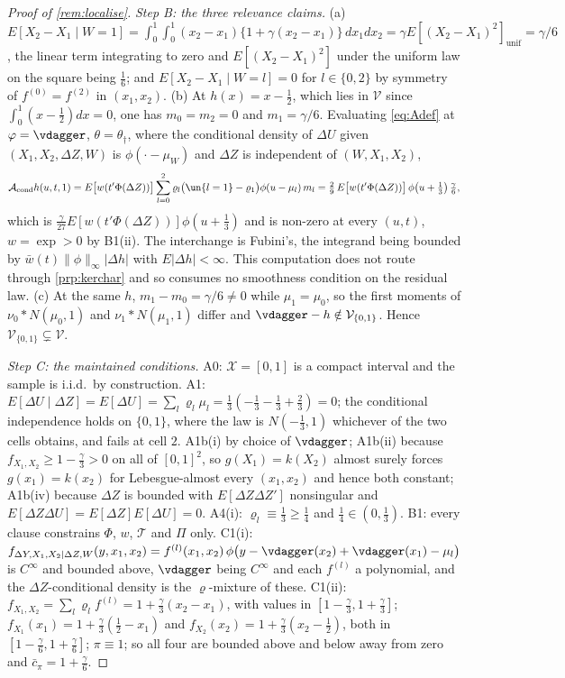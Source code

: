 \begin{proof}[Proof of \cref{rem:localise}]
\emph{Step B: the three relevance claims.} (a) $E[X_2-X_1\mid W=1]
=\int_0^1\!\!\int_0^1(x_2-x_1)\{1+\gamma(x_2-x_1)\}\,dx_1dx_2=\gamma E[(X_2-X_1)^{2}]_{\mathrm{unif}}
=\gamma/6$, the linear term integrating to zero and $E[(X_2-X_1)^{2}]$ under the uniform law on the
square being $\tfrac16$; and $E[X_2-X_1\mid W=l]=0$ for $l\in\{0,2\}$ by symmetry of $f^{(0)}=f^{(2)}$
in $(x_1,x_2)$. (b) At $h(x)=x-\tfrac12$, which lies in $\mathcal V$ since
$\int_0^1(x-\tfrac12)dx=0$, one has $m_0=m_2=0$ and $m_1=\gamma/6$. Evaluating \eqref{eq:Adef} at
$\varphi=\vdagger$, $\theta=\theta_\dagger$, where the conditional density of $\Delta U$ given
$(X_1,X_2,\Delta Z,W)$ is $\phi(\cdot-\mu_W)$ and $\Delta Z$ is independent of $(W,X_1,X_2)$,
\[
\mathcal A_{\mathrm{cond}}h(u,t,1)
=E\big[w(t'\Phi(\Delta Z))\big]\sum_{l=0}^{2}\varrho_l\big(\un\{l=1\}-\varrho_1\big)\phi(u-\mu_l)\,m_l
=\tfrac{2}{9}\,E\big[w(t'\Phi(\Delta Z))\big]\,\phi\big(u+\tfrac13\big)\,\tfrac{\gamma}{6},
\]
which is $\tfrac{\gamma}{27}E[w(t'\Phi(\Delta Z))]\phi(u+\tfrac13)$ and is non-zero at every $(u,t)$,
$w=\exp>0$ by B1(ii). The interchange is Fubini's, the integrand being bounded by
$\bar w(t)\|\phi\|_\infty|\Delta h|$ with $E|\Delta h|<\infty$. This computation does not route
through \cref{prp:kerchar} and so consumes no smoothness condition on the residual law. (c) At the
same $h$, $m_1-m_0=\gamma/6\neq0$ while $\mu_1=\mu_0$, so the first moments of
$\nu_0\ast N(\mu_0,1)$ and $\nu_1\ast N(\mu_1,1)$ differ and $\vdagger-h\notin\mathcal V_{\{0,1\}}$.
Hence $\mathcal V_{\{0,1\}}\subsetneq\mathcal V$.

\emph{Step C: the maintained conditions.} A0: $\mathcal X=[0,1]$ is a compact interval and the sample
is i.i.d.\ by construction. A1: $E[\Delta U\mid\Delta Z]=E[\Delta U]=\sum_l\varrho_l\mu_l
=\tfrac13(-\tfrac13-\tfrac13+\tfrac23)=0$; the conditional independence holds on $\{0,1\}$, where the
law is $N(-\tfrac13,1)$ whichever of the two cells obtains, and fails at cell $2$. A1b(i) by choice of
$\vdagger$; A1b(ii) because $f_{X_1,X_2}\ge1-\tfrac{\gamma}{3}>0$ on all of $[0,1]^{2}$, so
$g(X_1)=k(X_2)$ almost surely forces $g(x_1)=k(x_2)$ for Lebesgue-almost every $(x_1,x_2)$ and hence
both constant; A1b(iv) because $\Delta Z$ is bounded with $E[\Delta Z\Delta Z']$ nonsingular and
$E[\Delta Z\Delta U]=E[\Delta Z]E[\Delta U]=0$. A4(i): $\varrho_l\equiv\tfrac13\ge\tfrac14$ and
$\tfrac14\in(0,\tfrac13)$. B1: every clause constrains $\Phi$, $w$, $\mathcal T$ and $\Pi$ only. C1(i):
$f_{\Delta Y,X_1,X_2\mid\Delta Z,W}(y,x_1,x_2)=f^{(l)}(x_1,x_2)\,\phi\big(y-\vdagger(x_2)+\vdagger(x_1)-\mu_l\big)$
is $C^{\infty}$ and bounded above, $\vdagger$ being $C^{\infty}$ and each $f^{(l)}$ a polynomial, and
the $\Delta Z$-conditional density is the $\varrho$-mixture of these. C1(ii):
$f_{X_1,X_2}=\sum_l\varrho_lf^{(l)}=1+\tfrac{\gamma}{3}(x_2-x_1)$, with values in
$[1-\tfrac{\gamma}{3},1+\tfrac{\gamma}{3}]$; $f_{X_1}(x_1)=1+\tfrac{\gamma}{3}(\tfrac12-x_1)$ and
$f_{X_2}(x_2)=1+\tfrac{\gamma}{3}(x_2-\tfrac12)$, both in
$[1-\tfrac{\gamma}{6},1+\tfrac{\gamma}{6}]$; $\pi\equiv1$; so all four are bounded above and below away
from zero and $\bar c_\pi=1+\tfrac{\gamma}{6}$.


\end{proof}
